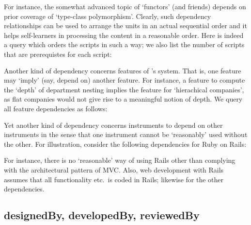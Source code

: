 

\noindent
For instance, the somewhat advanced topic of `functors' (and friends)
depends on prior coverage of `type-class polymorphism'. Clearly, such
dependency relationships can be used to arrange the units in an actual
sequential order and it helps self-learners in processing the content
in a reasonable order. Here is indeed a query which orders the scripts
in such a way; we also list the number of scripts that are
prerequistes for each script:



\noindent
Another kind of dependency concerns features of \ooo{}'s system. That
is, one feature may `imply' (say, depend on) another feature. For
instance, a feature to compute the `depth' of department nesting implies
the feature for `hierachical companies', as flat companies would not
give rise to a meaningful notion of depth. We query all feature
dependencies as follows:



\noindent
Yet another kind of dependency concerns instruments to depend on other
instruments in the sense that one instrument cannot be `reasonably'
used without the other. For illustration, consider the following
dependencies for Ruby on Rails:



\noindent
For instance, there is no `reasonable' way of using Rails other than
complying with the architectural pattern of MVC. Also, web development
with Rails assumes that all functionality etc.\ is coded in Rails;
likewise for the other dependencies.


\subsection{designedBy, developedBy, reviewedBy}
\label{S:designedBy}
\label{S:developedBy}
\label{S:reviewedBy}

